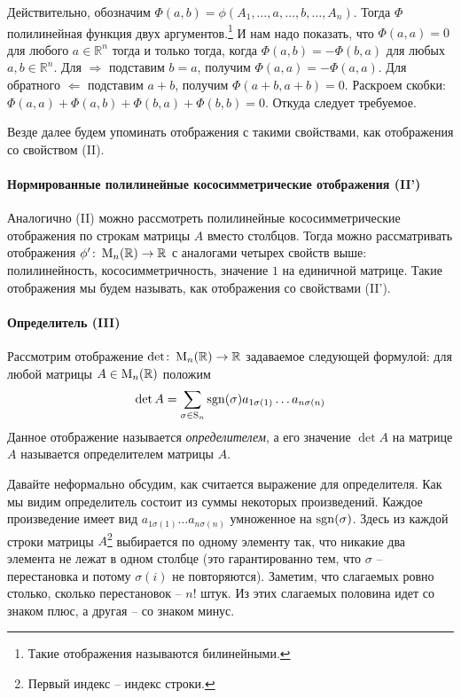 Действительно, обозначим $\Phi(a,b) = \phi(A_1,\ldots, a, \ldots, b, \ldots, A_n)$. Тогда $\Phi$ полилинейная функция двух аргументов.\footnote{Такие отображения называются билинейными.} И нам надо показать, что $\Phi(a,a) = 0$ для любого $a\in \mathbb R^n$ тогда и только тогда, когда $\Phi(a,b) = -\Phi(b,a)$ для любых $a,b\in\mathbb R^n$. Для $\Rightarrow$ подставим $b = a$, получим $\Phi(a,a) = -\Phi(a,a)$. Для обратного $\Leftarrow$ подставим $a+b$, получим $\Phi(a+b, a+b) = 0$. Раскроем скобки: $\Phi(a,a) + \Phi(a,b) + \Phi(b,a) + \Phi(b,b) = 0$. Откуда следует требуемое.


Везде далее будем упоминать отображения с такими свойствами, как отображения со свойством (II).

\paragraph{Нормированные полилинейные кососимметрические отображения (II')}
Аналогично (II) можно рассмотреть полилинейные кососимметрические отображения по строкам матрицы $A$ вместо столбцов. Тогда можно рассматривать отображения $\phi'\colon \operatorname{M}_{n}(\mathbb R)\to \mathbb R$ с аналогами четырех свойств выше: полилинейность, кососимметричность, значение $1$ на единичной матрице. Такие отображения мы будем называть, как отображения со свойствами (II').

\paragraph{Определитель (III)}

Рассмотрим отображение $\det \colon \operatorname{M}_{n}(\mathbb R)\to \mathbb R$ задаваемое следующей формулой: для любой матрицы $A\in\operatorname{M}_{n}(\mathbb R)$ положим
\[
\det A = \sum_{\sigma \in \operatorname{S}_{n}} \operatorname{sgn}(\sigma) a_{1\sigma(1)}\ldots a_{n\sigma(n)}
\]
Данное отображение называется {\it определителем}, а его значение $\det A$ на матрице $A$ называется определителем матрицы $A$.

Давайте неформально обсудим, как считается выражение для определителя. Как мы видим определитель состоит из суммы некоторых произведений. Каждое произведение имеет вид $a_{1\sigma(1)}\ldots a_{n\sigma(n)}$ умноженное на $\operatorname{sgn}(\sigma)$. Здесь из каждой строки матрицы $A$\footnote{Первый индекс -- индекс строки.} выбирается по одному элементу так, что никакие два элемента не лежат в одном столбце (это гарантированно тем, что $\sigma$ -- перестановка и потому $\sigma(i)$ не повторяются). Заметим, что слагаемых ровно столько, сколько перестановок -- $n!$ штук. Из этих слагаемых половина идет со знаком плюс, а другая -- со знаком минус.

